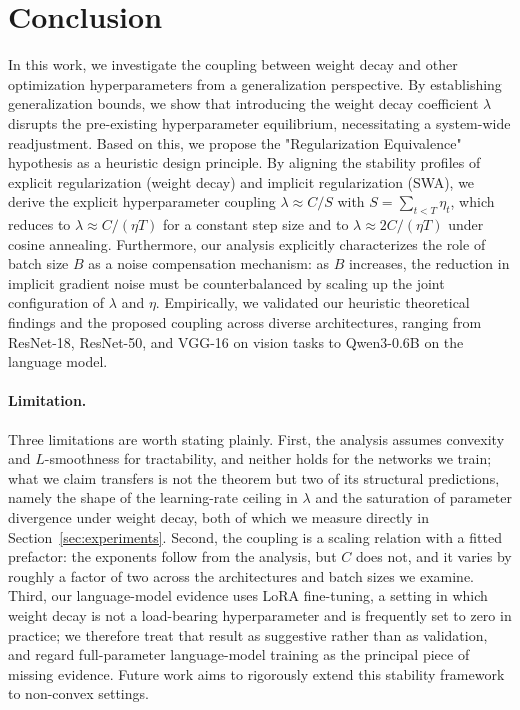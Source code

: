 \section{Conclusion}
In this work, we investigate the coupling between weight decay and other optimization hyperparameters from a generalization perspective. By establishing generalization bounds, we show that introducing the weight decay coefficient $\lambda$ disrupts the pre-existing hyperparameter equilibrium, necessitating a system-wide readjustment. Based on this, we propose the "Regularization Equivalence" hypothesis as a heuristic design principle. By aligning the stability profiles of explicit regularization (weight decay) and implicit regularization (SWA), we derive the explicit hyperparameter coupling $\lambda \approx C/S$ with $S=\sum_{t<T}\eta_t$, which reduces to $\lambda \approx C/(\eta T)$ for a constant step size and to $\lambda \approx 2C/(\eta T)$ under cosine annealing.
Furthermore, our analysis explicitly characterizes the role of batch size $B$ as a noise compensation mechanism: as $B$ increases, the reduction in implicit gradient noise must be counterbalanced by scaling up the joint configuration of $\lambda$ and $\eta$.
Empirically, we validated our heuristic theoretical findings and the proposed coupling across diverse architectures, ranging from ResNet-18, ResNet-50, and VGG-16 on vision tasks to Qwen3-0.6B on the language model.

\paragraph{Limitation.} 
Three limitations are worth stating plainly. First, the analysis assumes convexity and $L$-smoothness for tractability, and neither holds for the networks we train; what we claim transfers is not the theorem but two of its structural predictions, namely the shape of the learning-rate ceiling in $\lambda$ and the saturation of parameter divergence under weight decay, both of which we measure directly in Section~\ref{sec:experiments}. Second, the coupling is a scaling relation with a fitted prefactor: the exponents follow from the analysis, but $C$ does not, and it varies by roughly a factor of two across the architectures and batch sizes we examine. Third, our language-model evidence uses LoRA fine-tuning, a setting in which weight decay is not a load-bearing hyperparameter and is frequently set to zero in practice; we therefore treat that result as suggestive rather than as validation, and regard full-parameter language-model training as the principal piece of missing evidence. Future work aims to rigorously extend this stability framework to non-convex settings.